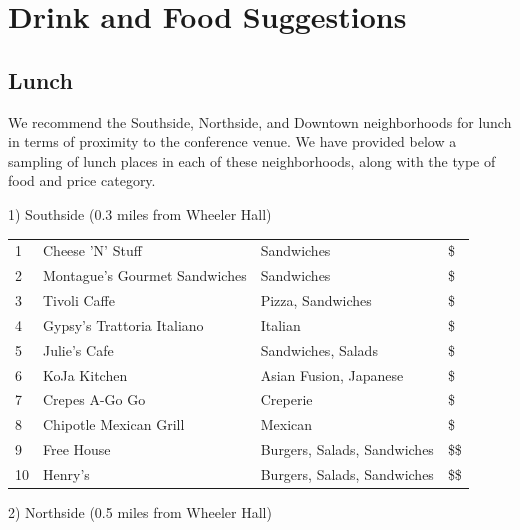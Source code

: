 \chapter{Drink and Food Suggestions}

\setlength\fboxsep{0pt}
\setlength\fboxrule{0.5pt}

\vspace{-0.5cm}
 \section{Lunch}

We recommend the Southside, Northside, and Downtown neighborhoods for lunch in terms of proximity to the conference venue. We have provided below a sampling of lunch places in each of these neighborhoods, along with the type of food and price category. 

\vspace{1mm}

1) Southside (0.3 miles from Wheeler Hall)

\begingroup
\small
\begin{multicols}{1}[]
    \begin{tabular}{p{0.3cm} p{4cm} p{5cm} p{0.5cm}}
        1 & Cheese 'N' Stuff & Sandwiches & \$\\
        2 & Montague's Gourmet Sandwiches & Sandwiches & \$\\
        3 & Tivoli Caffe & Pizza, Sandwiches & \$\\
        4 & Gypsy's Trattoria Italiano & Italian  & \$\\
        5 & Julie's Cafe & Sandwiches, Salads & \$\\ 
        6 & KoJa Kitchen & Asian Fusion, Japanese & \$\\
        7 & Crepes A-Go Go & Creperie & \$\\
        8 & Chipotle Mexican Grill & Mexican & \$\\
        9 & Free House & Burgers, Salads, Sandwiches & \$\$\\
        10 & Henry's & Burgers, Salads, Sandwiches & \$\$\\
    \end{tabular}
\end{multicols}
\endgroup
\normalsize 

2) Northside (0.5 miles from Wheeler Hall)

